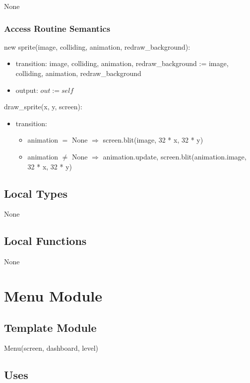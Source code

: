\documentclass[12pt]{article}
\begin{document}
None

\subsubsection* {Access Routine Semantics}

new sprite(image, colliding, animation, redraw\_background):
\begin{itemize}
    \item transition: image, colliding, animation, redraw\_background := image, colliding, animation, redraw\_background
    \item output: $out := self$
\end{itemize}

\noindent draw\_sprite(x, y, screen):
\begin{itemize}
    \item transition: 
    \begin{itemize}[]
        \item animation $=$ None $\Rightarrow$ screen.blit(image, 32 * x, 32 * y)
        \item animation $\neq$ None $\Rightarrow$ animation.update, screen.blit(animation.image, 32 * x, 32 * y)
    \end{itemize}
\end{itemize}

\subsection* {Local Types}

None

\subsection* {Local Functions}

None

\newpage

\section* {Menu Module}

\subsection*{Template Module}

Menu(screen, dashboard, level)

\subsection* {Uses}
\end{document}
